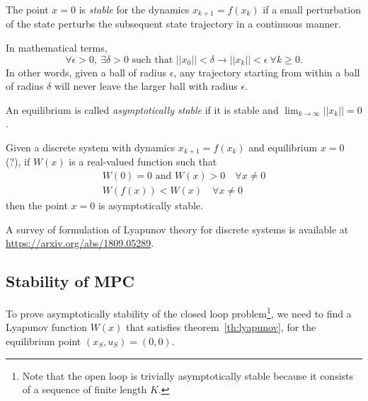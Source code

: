\begin{definition}
  The point $x=0$ is \emph{stable} for the dynamics $x_{k+1} = f(x_k)$ if a small perturbation of the state perturbs the subsequent state trajectory in a continuous manner.

  In mathematical terms,
  \begin{equation}
    \label{eq:lyapunov-stability-stable-equilibrium}
    \forall \epsilon > 0,\ \exists \delta > 0 \text{ such that } ||x_0|| < \delta \rightarrow ||x_k|| < \epsilon\ \forall k \ge 0.
  \end{equation}
  In other words, given a ball of radius $\epsilon$, any trajectory starting from within a ball of radius $\delta$ will never leave the larger ball with radius $\epsilon$.

  An equilibrium is called \emph{asymptotically stable} if it is stable and $\lim_{k\rightarrow \infty} ||x_k||=0$.
\end{definition}

\begin{theorem}
  \label{th:lyapunov}
  Given a discrete system with dynamics $x_{k+1} = f(x_k)$ and equilibrium $x=0$ (?), if $W(x)$ is a real-valued function such that
  \begin{equation*}
    \begin{aligned}
      W(0)=0 \textrm{ and } W(x)>0\quad \forall x\neq 0 \\
      W(f(x)) < W(x)\quad \forall x\neq 0
    \end{aligned}
  \end{equation*}
  then the point $x=0$ is asymptotically stable.
\end{theorem}
A survey of formulation of Lyapunov theory for discrete systems is available at \url{https://arxiv.org/abs/1809.05289}.

\subsection{Stability of MPC}
\label{sec:stability-MPC}

To prove asymptotically stability of the closed loop problem\footnote{Note that the open loop is trivially asymptotically stable because it consists of a sequence of finite length $K$.}, we need to find a Lyapunov function $W(x)$ that satisfies theorem~\ref{th:lyapunov}, for the equilibrium point $(x_S,u_S)=(0,0)$.

